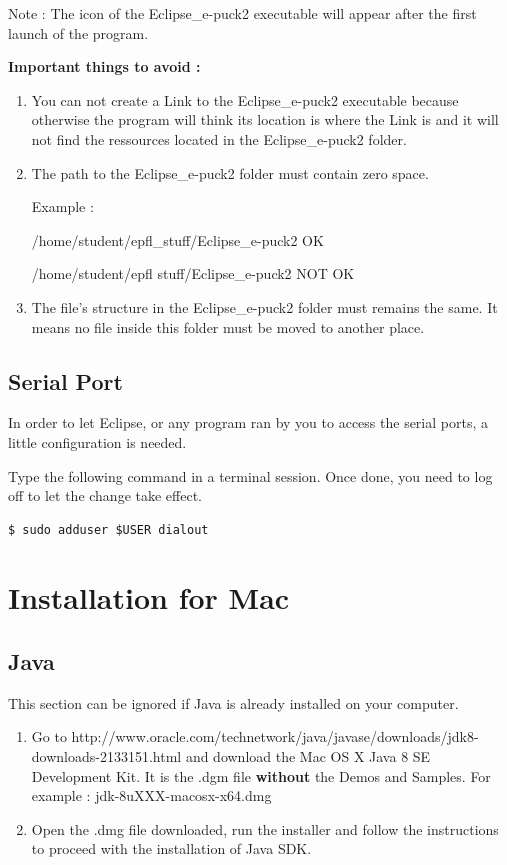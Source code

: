 \documentclass[a4paper]{article}
\begin{document}
Note : The icon of the Eclipse\_e-puck2 executable will appear after the first launch of the program.

\textbf{Important things to avoid :}

\begin{enumerate}
\item You can not create a Link to the Eclipse\_e-puck2 executable because otherwise the program will think its location is where the Link is and it will not find the ressources located in the Eclipse\_e-puck2 folder.
\item The path to the Eclipse\_e-puck2 folder must contain zero space. 

Example :

/home/student/epfl\_stuff/Eclipse\_e-puck2 OK

/home/student/epfl stuff/Eclipse\_e-puck2 NOT OK

\item The file's structure in the Eclipse\_e-puck2 folder must remains the same. It means no file inside this folder must be moved to another place.
\end{enumerate}

\subsection{Serial Port}

In order to let Eclipse, or any program ran by you to access the serial ports, a little configuration is needed.

Type the following command in a terminal session. Once done, you need to log off to let the change take effect.

\begin{lstlisting}
$ sudo adduser $USER dialout
\end{lstlisting}

\newpage
\section{Installation for Mac}

\subsection{Java}
This section can be ignored if Java is already installed on your computer.

\begin{enumerate}
\item Go to http://www.oracle.com/technetwork/java/javase/downloads/jdk8-downloads-2133151.html and download the Mac OS X Java 8 SE Development Kit. It is the .dgm file \textbf{without} the Demos and Samples.
For example : jdk-8uXXX-macosx-x64.dmg
\item Open the .dmg file downloaded, run the installer and follow the instructions to proceed with the installation of Java SDK.
\end{enumerate}
\end{document}
